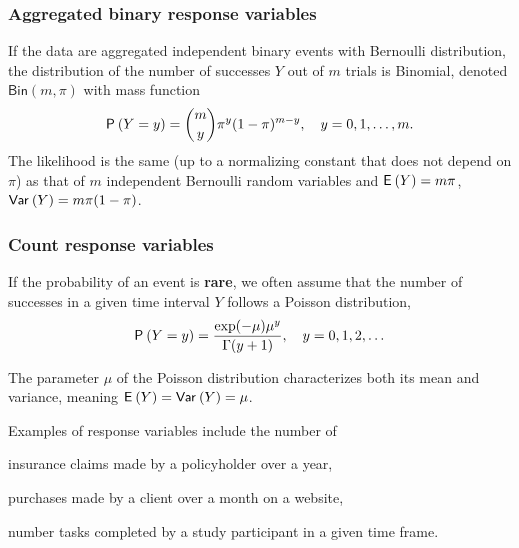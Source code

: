 \documentclass{beamer}
\begin{document}
\begin{frame}
\frametitle{Aggregated binary response variables}
If the data are aggregated independent binary events with Bernoulli distribution, 
the distribution of the number of successes $Y$ out of $m$ trials is Binomial, denoted $\mathsf{Bin}(m, \pi)$ with mass function
\begin{align*}
\P{Y=y} = \binom{m}{y}\pi^y (1-\pi)^{m-y}, \quad y=0, 1, \ldots, m.
\end{align*}
The likelihood is the same (up to a normalizing constant that does not depend on $\pi$) 
as that of $m$ independent Bernoulli random variables and $\E{Y}=m \pi$, $\Va{Y}=m\pi(1-\pi)$.
\end{frame}
\begin{frame}
\frametitle{Count response variables}
\bi
\item \alert{If the probability of an event is \textbf{rare}}, we often assume that the number of successes in a given time interval $Y$ follows a \alert{Poisson} distribution,
\begin{align*}
\P{Y=y} = \frac{\exp(-\mu)\mu^y}{\Gamma(y+1)}, \quad y=0, 1, 2, \ldots
\end{align*}
\item The parameter $\mu$ of the Poisson distribution characterizes both its mean and variance, meaning $\E{Y}=\Va{Y}=\mu$.
\item Examples of response variables include the number of 
 
\bi
\item insurance claims made by a policyholder over a year,
\item  purchases made by a client over a month on a website,
 \item number tasks completed by a study participant in a given time frame.
\ei
\ei
\end{frame} 
%  
\end{document}
